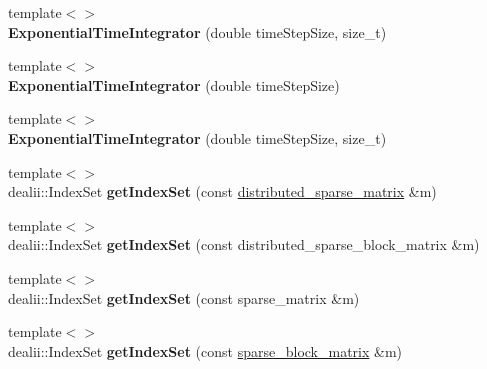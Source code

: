 \begin{DoxyCompactItemize}
\item 
\hypertarget{classnatrium_1_1ExponentialTimeIntegrator_acbd606f38f9c5c0b4cb9b9fc817f1186}{
{\footnotesize template$<$$>$ }\\{\bfseries ExponentialTimeIntegrator} (double timeStepSize, size\_\-t)}
\label{classnatrium_1_1ExponentialTimeIntegrator_acbd606f38f9c5c0b4cb9b9fc817f1186}

\item 
\hypertarget{classnatrium_1_1ExponentialTimeIntegrator_a9fbf0f44e2d68eab2df6d767e6f08c77}{
{\footnotesize template$<$$>$ }\\{\bfseries ExponentialTimeIntegrator} (double timeStepSize)}
\label{classnatrium_1_1ExponentialTimeIntegrator_a9fbf0f44e2d68eab2df6d767e6f08c77}

\item 
\hypertarget{classnatrium_1_1ExponentialTimeIntegrator_a716b2f09970240253c9175e3ad5e3965}{
{\footnotesize template$<$$>$ }\\{\bfseries ExponentialTimeIntegrator} (double timeStepSize, size\_\-t)}
\label{classnatrium_1_1ExponentialTimeIntegrator_a716b2f09970240253c9175e3ad5e3965}

\item 
\hypertarget{classnatrium_1_1ExponentialTimeIntegrator_a04d6a47d38318ab92ba4bd22b834d6c3}{
{\footnotesize template$<$$>$ }\\dealii::IndexSet {\bfseries getIndexSet} (const \hyperlink{namespacenatrium_a860e92befb23651241c8b3d61a0d4034}{distributed\_\-sparse\_\-matrix} \&m)}
\label{classnatrium_1_1ExponentialTimeIntegrator_a04d6a47d38318ab92ba4bd22b834d6c3}

\item 
\hypertarget{classnatrium_1_1ExponentialTimeIntegrator_aa58b4f252c2f19808f10102d60eed3a9}{
{\footnotesize template$<$$>$ }\\dealii::IndexSet {\bfseries getIndexSet} (const distributed\_\-sparse\_\-block\_\-matrix \&m)}
\label{classnatrium_1_1ExponentialTimeIntegrator_aa58b4f252c2f19808f10102d60eed3a9}

\item 
\hypertarget{classnatrium_1_1ExponentialTimeIntegrator_a6ea6d696834a57e0e8af03558ffc1d5b}{
{\footnotesize template$<$$>$ }\\dealii::IndexSet {\bfseries getIndexSet} (const sparse\_\-matrix \&m)}
\label{classnatrium_1_1ExponentialTimeIntegrator_a6ea6d696834a57e0e8af03558ffc1d5b}

\item 
\hypertarget{classnatrium_1_1ExponentialTimeIntegrator_a0d43b0a3b92ced2b9b7755549742baa0}{
{\footnotesize template$<$$>$ }\\dealii::IndexSet {\bfseries getIndexSet} (const \hyperlink{namespacenatrium_acd63e25d68fdb74dd9b789bb2e836cb8}{sparse\_\-block\_\-matrix} \&m)}
\label{classnatrium_1_1ExponentialTimeIntegrator_a0d43b0a3b92ced2b9b7755549742baa0}

\end{DoxyCompactItemize}


